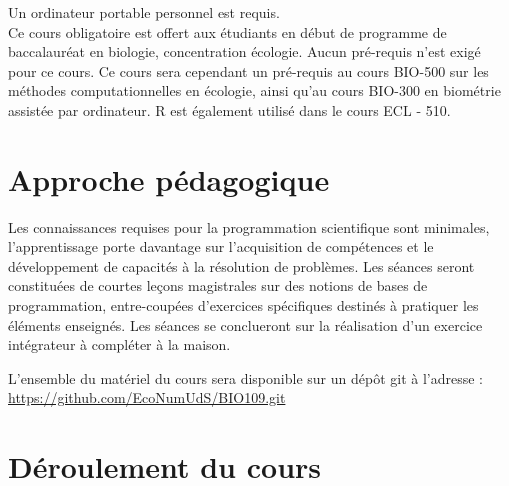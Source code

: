 \documentclass[12]{article}
\begin{document}
    Un ordinateur portable personnel est requis. \\

	Ce cours obligatoire est offert aux étudiants en début de programme de
	baccalauréat en biologie, concentration écologie. Aucun pré-requis n'est
	exigé pour ce cours. Ce cours sera cependant un pré-requis au cours
	BIO-500 sur les méthodes computationnelles en écologie, ainsi qu'au cours
	BIO-300 en biométrie assistée par ordinateur. R est également utilisé
	dans le cours ECL - 510.

	\section*{Approche pédagogique}

	Les connaissances requises pour la programmation scientifique sont
	minimales, l'apprentissage porte davantage sur l'acquisition de
	compétences et le développement de capacités à la résolution de problèmes.
	Les séances seront constituées de courtes leçons magistrales sur des
	notions de bases de programmation, entre-coupées d'exercices spécifiques
	destinés à pratiquer les éléments enseignés. Les séances se conclueront
	sur la réalisation d'un exercice intégrateur à compléter à la maison.

	L'ensemble du matériel du cours sera disponible sur un dépôt git à l'adresse :\\
	\url{https://github.com/EcoNumUdS/BIO109.git}

	\section*{Déroulement du cours}
\end{document}
